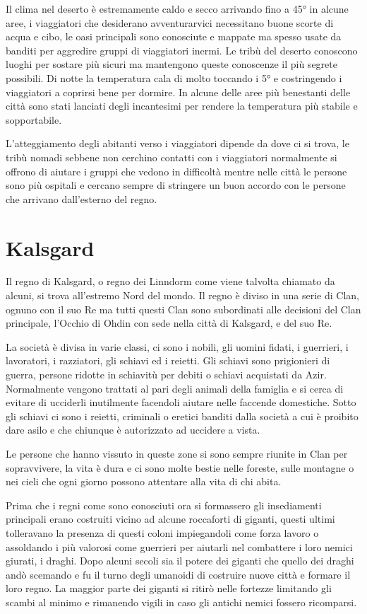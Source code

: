\documentclass[letterpaper,twocolumn,openany,nodeprecatedcode]{dndbook}
\begin{document}
Il clima nel deserto è estremamente caldo e secco arrivando fino a 45° in alcune aree, i viaggiatori che desiderano avventurarvici necessitano buone scorte di acqua e cibo, le oasi principali sono conosciute e mappate ma spesso usate da banditi per aggredire gruppi di viaggiatori inermi. Le tribù del deserto conoscono luoghi per sostare più sicuri ma mantengono queste conoscenze il più segrete possibili. Di notte la temperatura cala di molto toccando i 5° e costringendo i viaggiatori a coprirsi bene per dormire. In alcune delle aree più benestanti delle città sono stati lanciati degli incantesimi per rendere la temperatura più stabile e sopportabile.

L'atteggiamento degli abitanti verso i viaggiatori dipende da dove ci si trova, le tribù nomadi sebbene non cerchino contatti con i viaggiatori normalmente si offrono di aiutare i gruppi che vedono in difficoltà mentre nelle città le persone sono più ospitali e cercano sempre di stringere un buon accordo con le persone che arrivano dall'esterno del regno. 

\section{Kalsgard}
Il regno di Kalsgard, o regno dei Linndorm come viene talvolta chiamato da alcuni, si trova all'estremo Nord del mondo. Il regno è diviso in una serie di Clan, ognuno con il suo Re ma tutti questi Clan sono subordinati alle decisioni del Clan principale, l'Occhio di Ohdin con sede nella città di Kalsgard, e del suo Re.

La società è divisa in varie classi, ci sono i nobili, gli uomini fidati, i guerrieri, i lavoratori, i razziatori, gli schiavi ed i reietti. Gli schiavi sono prigionieri di guerra, persone ridotte in schiavitù per debiti o schiavi acquistati da Azir. Normalmente vengono trattati al pari degli animali della famiglia e si cerca di evitare di ucciderli inutilmente facendoli aiutare nelle faccende domestiche. Sotto gli schiavi ci sono i reietti, criminali o eretici banditi dalla società a cui è proibito dare asilo e che chiunque è autorizzato ad uccidere a vista.

Le persone che hanno vissuto in queste zone si sono sempre riunite in Clan per sopravvivere, la vita è dura e ci sono molte bestie nelle foreste, sulle montagne o nei cieli che ogni giorno possono attentare alla vita di chi abita.

Prima che i regni come sono conosciuti ora si formassero gli insediamenti principali erano costruiti vicino ad alcune roccaforti di giganti, questi ultimi tolleravano la presenza di questi coloni impiegandoli come forza lavoro o assoldando i più valorosi come guerrieri per aiutarli nel combattere i loro nemici giurati, i draghi. Dopo alcuni secoli sia il potere dei giganti che quello dei draghi andò scemando e fu il turno degli umanoidi di costruire nuove città e formare il loro regno. La maggior parte dei giganti si ritirò nelle fortezze limitando gli scambi al minimo e rimanendo vigili in caso gli antichi nemici fossero ricomparsi.
\end{document}

